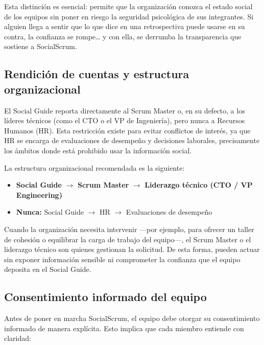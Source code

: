 Esta distinción es esencial: permite que la organización conozca el estado social de los equipos sin poner en riesgo la seguridad psicológica de sus integrantes. Si alguien llega a sentir que lo que dice en una retrospectiva puede usarse en su contra, la confianza se rompe… y con ella, se derrumba la transparencia que sostiene a SocialScrum.

\subsection{Rendición de cuentas y estructura organizacional}

El Social Guide reporta directamente al Scrum Master o, en su defecto, a los líderes técnicos (como el CTO o el VP de Ingeniería), pero nunca a Recursos Humanos (HR). Esta restricción existe para evitar conflictos de interés, ya que HR se encarga de evaluaciones de desempeño y decisiones laborales, precisamente los ámbitos donde está prohibido usar la información social.

La estructura organizacional recomendada es la siguiente:

\begin{itemize}
    \item \textbf{Social Guide} $\rightarrow$ \textbf{Scrum Master} $\rightarrow$ \textbf{Liderazgo técnico (CTO / VP Engineering)}
    \item \textbf{Nunca:} Social Guide $\rightarrow$ HR $\rightarrow$ Evaluaciones de desempeño
\end{itemize}

Cuando la organización necesita intervenir —por ejemplo, para ofrecer un taller de cohesión o equilibrar la carga de trabajo del equipo—, el Scrum Master o el liderazgo técnico son quienes gestionan la solicitud. De esta forma, pueden actuar sin exponer información sensible ni comprometer la confianza que el equipo deposita en el Social Guide.

\subsection{Consentimiento informado del equipo}

Antes de poner en marcha SocialScrum, el equipo debe otorgar su consentimiento informado de manera explícita. Esto implica que cada miembro entiende con claridad:

